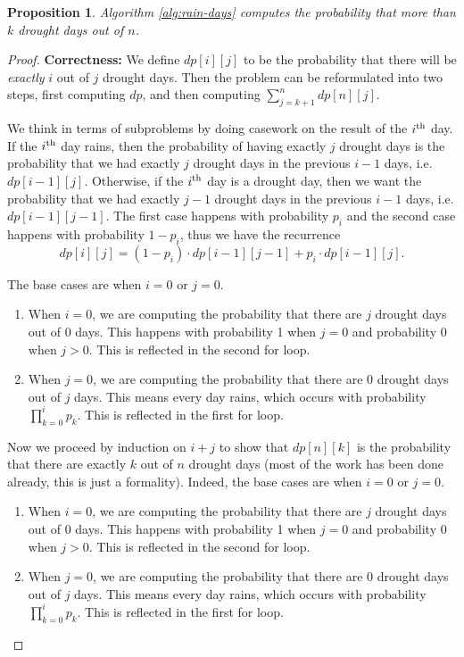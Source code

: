 \documentclass[10pt]{article}
\newtheorem{proposition}[lemma]{Proposition}
\providecommand{\Kth}[1]{\ensuremath{{#1}^{\rm th}}}
\begin{document}
\begin{proposition}
  Algorithm \ref*{alg:rain-days} computes the probability that more than \(k\) drought days out of \(n\).
\end{proposition}

\begin{proof}
  \textbf{Correctness:} We define \(dp[i][j]\) to be the probability that there will be \textit{exactly} \(i\) out of \(j\) drought days. Then the problem can be reformulated into two steps, first computing \(dp\), and then computing \(\sum_{j = k + 1}^n dp[n][j]\). 

  We think in terms of subproblems by doing casework on the result of the \Kth{i} day. If the \Kth{i} day rains, then the probability of having exactly \(j\) drought days is the probability that we had exactly \(j\) drought days in the previous \(i - 1\) days, i.e. \(dp[i - 1][j]\). Otherwise, if the \Kth{i} day is a drought day, then we want the probability that we had exactly \(j - 1\) drought days in the previous \(i - 1\) days, i.e. \(dp[i - 1][j - 1]\). The first case happens with probability \(p_i\) and the second case happens with probability \(1 - p_i\), thus we have the recurrence \[dp[i][j] = (1 - p_i) \cdot dp[i - 1][j - 1] + p_i \cdot dp[i - 1][j].\] 

  The base cases are when \(i = 0\) or \(j = 0\). 
  \begin{enumerate}
    \item When \(i = 0\), we are computing the probability that there are \(j\) drought days out of 0 days. This happens with probability 1 when \(j = 0\) and probability 0 when \(j > 0\). This is reflected in the second for loop. 
    \item When \(j = 0\), we are computing the probability that there are 0 drought days out of \(j\) days. This means every day rains, which occurs with probability \(\prod_{k = 0}^i p_k\). This is reflected in the first for loop. 
  \end{enumerate}

  Now we proceed by induction on \(i + j\) to show that \(dp[n][k]\) is the probability that there are exactly \(k\) out of \(n\) drought days (most of the work has been done already, this is just a formality). Indeed, 
  the base cases are when \(i = 0\) or \(j = 0\). 
  \begin{enumerate}
    \item When \(i = 0\), we are computing the probability that there are \(j\) drought days out of 0 days. This happens with probability 1 when \(j = 0\) and probability 0 when \(j > 0\). This is reflected in the second for loop. 
    \item When \(j = 0\), we are computing the probability that there are 0 drought days out of \(j\) days. This means every day rains, which occurs with probability \(\prod_{k = 0}^i p_k\). This is reflected in the first for loop. 
  \end{enumerate}


\end{proof}
\end{document}
